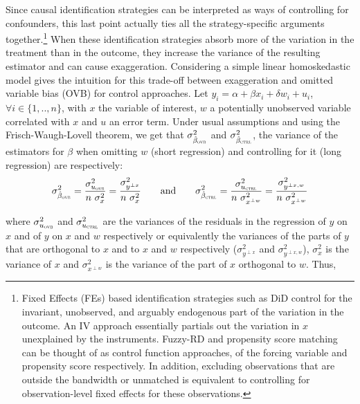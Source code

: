 			Since causal identification strategies can be interpreted as ways of controlling for confounders, this last point actually ties all the strategy-specific arguments together.\footnote{Fixed Effects (FEs) based identification strategies such as DiD control for the invariant, unobserved, and arguably endogenous part of the variation in the outcome. An IV approach essentially partials out the variation in $x$ unexplained by the instruments. %
			 Fuzzy-RD and propensity score matching can be thought of as control function approaches, of the forcing variable and propensity score respectively. In addition, excluding observations that are outside the bandwidth or unmatched is equivalent to controlling for observation-level fixed effects for these observations.} When these identification strategies absorb more of the variation in the treatment than in the outcome, they increase the variance of the resulting estimator and can cause exaggeration. 
			 Considering a simple linear homoskedastic model gives the intuition for this trade-off between exaggeration and omitted variable bias (OVB) for control approaches.  Let $y_{i} = \alpha + \beta x_{i} + \delta w_{i} + u_{i}$, $\forall i \in \{1, .., n\}$,  with $x$ the variable of interest, $w$ a potentially unobserved variable correlated with $x$ and $u$ an error term. Under usual assumptions and using the Frisch-Waugh-Lovell theorem, we get that $ \sigma_{\hat{\beta}_{\textsc{ovb}}}^2$ and $ \sigma_{\hat{\beta}_{\textsc{ctrl}}}^2$, the variance of the estimators for $\beta$ when omitting $w$ (short regression) and controlling for it (long regression) are respectively:
			~
			\[
				\sigma_{\hat{\beta}_{\textsc{ovb}}}^2 =
				 \dfrac{\sigma^{2}_{u_{\textsc{ovb}}}}{n \ \sigma_{x}^{2}} =
				 \dfrac{\sigma^{2}_{y^{\perp x}}}{n \ \sigma_{x}^{2}}
				 \qquad \text{and} \qquad
				 \sigma_{\hat{\beta}_{\textsc{ctrl}}}^2 = 
				 \dfrac{\sigma^{2}_{u_{\textsc{ctrl}}}}{n \ \sigma_{x^{\perp w}}^{2}} =
				  \dfrac{\sigma^{2}_{y^{\perp x, w}}}{n \ \sigma_{x^{\perp w}}^{2}}
			\]
			
			where $\sigma^{2}_{u_{\textsc{ovb}}}$ and $\sigma^{2}_{u_{\textsc{ctrl}}}$ are the variances of the residuals in the regression of $y$ on $x$ and of $y$ on $x$ and $w$ respectively or equivalently the variances of the parts of $y$ that are orthogonal to $x$ and to $x$ and $w$ respectively ($\sigma^{2}_{y^{\perp x}}$ and $\sigma^{2}_{y^{\perp x, w}}$), $\sigma^{2}_{x}$ is the variance of $x$ and $\sigma^{2}_{x^{\perp w}}$ is the variance of the part of $x$ orthogonal to $w$. Thus,
			
